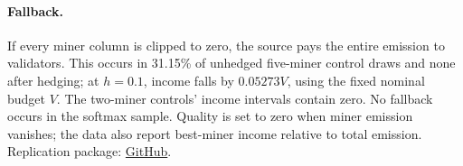 \documentclass[sigconf,anonymous,review]{acmart}
\numberwithin{equation}{section}
\begin{document}
\paragraph{Fallback.} If every miner column is clipped to zero, the source
pays the entire emission to validators. This occurs in 31.15\% of
unhedged five-miner control draws and none after hedging; at $h=0.1$,
income falls by $0.05273V$, using the fixed nominal budget $V$.
The two-miner controls' income intervals contain zero.
No fallback occurs in the softmax sample. Quality is set to zero when
miner emission vanishes; the data also report best-miner income
relative to total emission.
Replication package: \href{https://github.com/submissionrepo/bittensor-yuma-replication}{GitHub}.
\end{document}

